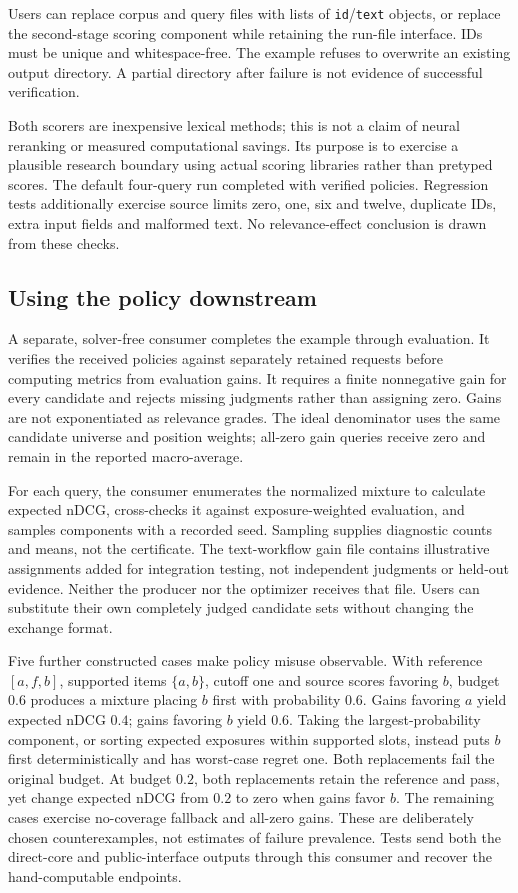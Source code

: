 \documentclass[runningheads]{llncs}
\begin{document}
Users can replace corpus and query files with lists of \texttt{id}/\texttt{text}
objects, or replace the second-stage scoring component while retaining the
run-file interface. IDs must be unique and whitespace-free. The example
refuses to overwrite an existing output directory. A partial directory after
failure is not evidence of successful verification.

Both scorers are inexpensive lexical methods; this is not a claim of neural
reranking or measured computational savings. Its purpose is to exercise a
plausible research boundary using actual scoring libraries rather than
pretyped scores. The default four-query run completed with verified policies.
Regression tests additionally exercise source limits zero, one, six and twelve,
duplicate IDs, extra input fields and malformed text. No relevance-effect
conclusion is drawn from these checks.

\subsection{Using the policy downstream}
A separate, solver-free consumer completes the example through evaluation.
It verifies the received policies against separately retained requests before
computing metrics from evaluation gains. It requires a finite nonnegative gain for every
candidate and rejects missing judgments rather than assigning zero. Gains are
not exponentiated as relevance grades. The ideal denominator uses the same
candidate universe and position weights; all-zero gain queries receive zero
and remain in the reported macro-average.

For each query, the consumer enumerates the normalized mixture to calculate
expected nDCG, cross-checks it against exposure-weighted evaluation, and samples
components with a recorded seed. Sampling supplies diagnostic counts and means,
not the certificate. The text-workflow gain file contains illustrative assignments
added for integration testing, not independent judgments or held-out evidence.
Neither the producer nor the optimizer receives that file. Users can substitute
their own completely judged candidate sets without changing the exchange format.

Five further constructed cases make policy misuse observable. With reference
$[a,f,b]$, supported items $\{a,b\}$, cutoff one and source scores favoring $b$,
budget $0.6$ produces a mixture placing $b$ first with probability $0.6$.
Gains favoring $a$ yield expected nDCG $0.4$; gains favoring $b$ yield $0.6$.
Taking the largest-probability component, or sorting expected exposures within
supported slots, instead puts $b$ first deterministically and has worst-case
regret one. Both replacements fail the original budget. At budget $0.2$, both
replacements retain the reference and pass, yet change expected nDCG from $0.2$
to zero when gains favor $b$. The remaining cases exercise no-coverage fallback
and all-zero gains. These are deliberately chosen counterexamples, not estimates
of failure prevalence. Tests send both the direct-core and public-interface
outputs through this consumer and recover the hand-computable endpoints.
\end{document}
